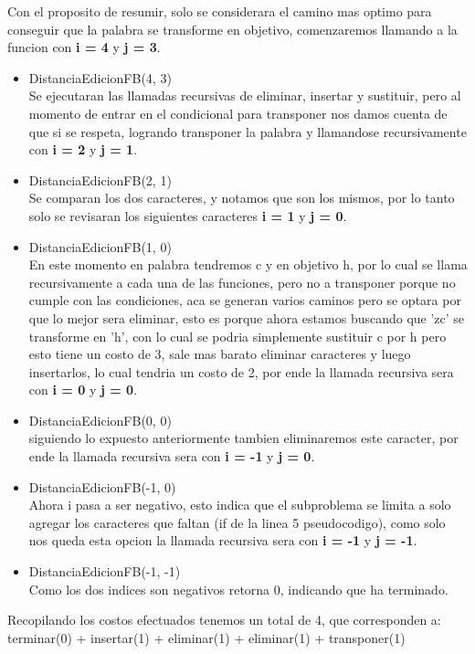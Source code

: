 Con el proposito de resumir, solo se considerara el camino mas optimo para conseguir que la palabra se transforme en objetivo, comenzaremos llamando a la funcion con \textbf{i = 4} y \textbf{j = 3}.
\begin{itemize}
    \item DistanciaEdicionFB(4, 3)\\Se ejecutaran las llamadas recursivas de eliminar, insertar y sustituir, pero al momento de entrar en el condicional para transponer nos damos cuenta de que si se respeta, logrando transponer la palabra y llamandose recursivamente con \textbf{i = 2} y \textbf{j = 1}.
    \item DistanciaEdicionFB(2, 1)\\Se comparan los dos caracteres, y notamos que son los mismos, por lo tanto solo se revisaran los siguientes caracteres \textbf{i = 1} y \textbf{j = 0}.
    \item DistanciaEdicionFB(1, 0)\\En este momento en palabra tendremos c y en objetivo h, por lo cual se llama recursivamente a cada una de las funciones, pero no a transponer porque no cumple con las condiciones, aca se generan varios caminos pero se optara por que lo mejor sera eliminar, esto es porque ahora estamos buscando que 'zc' se transforme en 'h', con lo cual se podria simplemente sustituir c por h pero esto tiene un costo de 3, sale mas barato eliminar caracteres y luego insertarlos, lo cual tendria un costo de 2, por ende la llamada recursiva sera con \textbf{i = 0} y \textbf{j = 0}.
    \item DistanciaEdicionFB(0, 0)\\siguiendo lo expuesto anteriormente tambien eliminaremos este caracter, por ende la llamada recursiva sera con \textbf{i = -1} y \textbf{j = 0}.
    \item DistanciaEdicionFB(-1, 0)\\Ahora i pasa a ser negativo, esto indica que el subproblema se limita a solo agregar los caracteres que faltan (if de la linea 5 pseudocodigo), como solo nos queda esta opcion  la llamada recursiva sera con \textbf{i = -1} y \textbf{j = -1}.
    \item DistanciaEdicionFB(-1, -1)\\Como los dos indices son negativos retorna 0, indicando que ha terminado.
\end{itemize}
Recopilando los costos efectuados tenemos un total de 4, que corresponden a:\\
terminar(0) + insertar(1) + eliminar(1) + eliminar(1) + transponer(1)